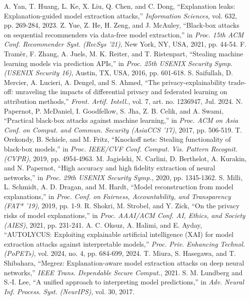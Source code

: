  A. Yan, T. Huang, L. Ke, X. Liu, Q. Chen, and C. Dong, ``Explanation leaks: Explanation-guided model extraction attacks,'' \textit{Information Sciences}, vol. 632, pp. 269-284, 2023.
 Z. Yue, Z. He, H. Zeng, and J. McAuley, ``Black-box attacks on sequential recommenders via data-free model extraction,'' in \textit{Proc. 15th ACM Conf. Recommender Syst. (RecSys '21)}, New York, NY, USA, 2021, pp. 44-54.
 F. Tram\`er, F. Zhang, A. Juels, M. K. Reiter, and T. Ristenpart, ``Stealing machine learning models via prediction APIs,'' in \textit{Proc. 25th USENIX Security Symp. (USENIX Security 16)}, Austin, TX, USA, 2016, pp. 601-618.
 S. Saifullah, D. Mercier, A. Lucieri, A. Dengel, and S. Ahmed, ``The privacy-explainability trade-off: unraveling the impacts of differential privacy and federated learning on attribution methods,'' \textit{Front. Artif. Intell.}, vol. 7, art. no. 1236947, Jul. 2024.
 N. Papernot, P. McDaniel, I. Goodfellow, S. Jha, Z. B. Celik, and A. Swami, ``Practical black-box attacks against machine learning,'' in \textit{Proc. ACM on Asia Conf. on Comput. and Commun. Security (AsiaCCS '17)}, 2017, pp. 506-519.
 T. Orekondy, B. Schiele, and M. Fritz, ``Knockoff nets: Stealing functionality of black-box models,'' in \textit{Proc. IEEE/CVF Conf. Comput. Vis. Pattern Recognit. (CVPR)}, 2019, pp. 4954-4963.
 M. Jagielski, N. Carlini, D. Berthelot, A. Kurakin, and N. Papernot, ``High accuracy and high fidelity extraction of neural networks,'' in \textit{Proc. 29th USENIX Security Symp.}, 2020, pp. 1345-1362.
 S. Milli, L. Schmidt, A. D. Dragan, and M. Hardt, ``Model reconstruction from model explanations,'' in \textit{Proc. Conf. on Fairness, Accountability, and Transparency (FAT* '19)}, 2019, pp. 1-9.
 R. Shokri, M. Strobel, and Y. Zick, ``On the privacy risks of model explanations,'' in \textit{Proc. AAAI/ACM Conf. AI, Ethics, and Society (AIES)}, 2021, pp. 231-241.
 A. C. Oksuz, A. Halimi, and E. Ayday, ``AUTOLYCUS: Exploiting explainable artificial intelligence (XAI) for model extraction attacks against interpretable models,'' \textit{Proc. Priv. Enhancing Technol. (PoPETs)}, vol. 2024, no. 4, pp. 684-699, 2024.
 T. Miura, S. Hasegawa, and T. Shibahara, ``Megrez: Explanation-aware model extraction attacks on deep neural networks,'' \textit{IEEE Trans. Dependable Secure Comput.}, 2021.
 S. M. Lundberg and S.-I. Lee, ``A unified approach to interpreting model predictions,'' in \textit{Adv. Neural Inf. Process. Syst. (NeurIPS)}, vol. 30, 2017.
